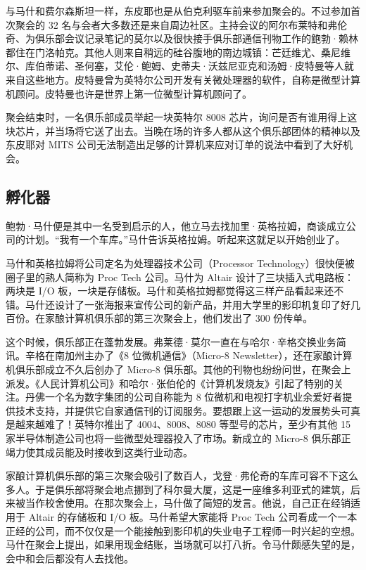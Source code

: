 \documentclass[12pt,UTF8]{ctexbook}
\begin{document}
与马什和费尔森斯坦一样，东皮耶也是从伯克利驱车前来参加聚会的。不过参加首次聚会的 32 名与会者大多数还是来自周边社区。主持会议的阿尔布莱特和弗伦奇、为俱乐部会议记录笔记的莫尔以及很快接手俱乐部通信刊物工作的鲍勃·赖林都住在门洛帕克。其他人则来自稍远的硅谷腹地的南边城镇：芒廷维尤、桑尼维尔、库伯蒂诺、圣何塞，艾伦·鲍姆、史蒂夫·沃兹尼亚克和汤姆·皮特曼等人就来自这些地方。皮特曼曾为英特尔公司开发有关微处理器的软件，自称是微型计算机顾问。皮特曼也许是世界上第一位微型计算机顾问了。

聚会结束时，一名俱乐部成员举起一块英特尔 8008 芯片，询问是否有谁用得上这块芯片，并当场将它送了出去。当晚在场的许多人都从这个俱乐部团体的精神以及东皮耶对 MITS 公司无法制造出足够的计算机来应对订单的说法中看到了大好机会。





\subsection{孵化器}


鲍勃·马什便是其中一名受到启示的人，他立马去找加里·英格拉姆，商谈成立公司的计划。“我有一个车库。”马什告诉英格拉姆。听起来这就足以开始创业了。

马什和英格拉姆将公司定名为处理器技术公司（Processor Technology）很快便被圈子里的熟人简称为 Proc Tech 公司。马什为 Altair 设计了三块插入式电路板：两块是 I/O 板，一块是存储板。马什和英格拉姆都觉得这三样产品看起来还不错。马什还设计了一张海报来宣传公司的新产品，并用大学里的影印机复印了好几百份。在家酿计算机俱乐部的第三次聚会上，他们发出了 300 份传单。

这个时候，俱乐部正在蓬勃发展。弗莱德·莫尔一直在与哈尔·辛格交换业务简讯。辛格在南加州主办了《8 位微机通信》（Micro-8 Newsletter），还在家酿计算机俱乐部成立不久后创办了 Micro-8 俱乐部。其他的刊物也纷纷问世，在聚会上派发。《人民计算机公司》和哈尔·张伯伦的《计算机发烧友》引起了特别的关注。丹佛一个名为数字集团的公司自称能为 8 位微机和电视打字机业余爱好者提供技术支持，并提供它自家通信刊的订阅服务。要想跟上这一运动的发展势头可真是越来越难了！英特尔推出了 4004、8008、8080 等型号的芯片，至少有其他 15 家半导体制造公司也将一些微型处理器投入了市场。新成立的 Micro-8 俱乐部正竭力使其成员能及时接收到这类行业动态。

家酿计算机俱乐部的第三次聚会吸引了数百人，戈登·弗伦奇的车库可容不下这么多人。于是俱乐部将聚会地点挪到了科尔曼大厦，这是一座维多利亚式的建筑，后来被当作校舍使用。在那次聚会上，马什做了简短的发言。他说，自己正在经销适用于 Altair 的存储板和 I/O 板。马什希望大家能将 Proc Tech 公司看成一个一本正经的公司，而不仅仅是一个能接触到影印机的失业电子工程师一时兴起的空想。马什在聚会上提出，如果用现金结账，当场就可以打八折。令马什颇感失望的是，会中和会后都没有人去找他。
\end{document}
